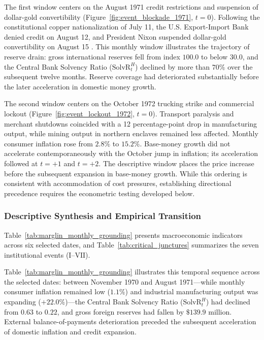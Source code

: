 The first window centers on the August 1971 credit restrictions and suspension of dollar-gold convertibility (Figure~\ref{fig:event_blockade_1971}, $t=0$). Following the constitutional copper nationalization of July 11, the U.S. Export-Import Bank denied credit on August 12, and President Nixon suspended dollar-gold convertibility on August 15 \citep{Zoeller2019}. This monthly window illustrates the trajectory of reserve drain: gross international reserves fell from index $100.0$ to below $30.0$, and the Central Bank Solvency Ratio ($\text{SolvR}^{H}_t$) declined by more than $70\%$ over the subsequent twelve months. Reserve coverage had deteriorated substantially before the later acceleration in domestic money growth.

The second window centers on the October 1972 trucking strike and commercial lockout (Figure~\ref{fig:event_lockout_1972}, $t=0$). Transport paralysis and merchant shutdowns coincided with a 12 percentage-point drop in manufacturing output, while mining output in northern enclaves remained less affected. Monthly consumer inflation rose from $2.8\%$ to $15.2\%$. Base-money growth did not accelerate contemporaneously with the October jump in inflation; its acceleration followed at $t = +1$ and $t = +2$. The descriptive window places the price increase before the subsequent expansion in base-money growth. While this ordering is consistent with accommodation of cost pressures, establishing directional precedence requires the econometric testing developed below.

\subsubsection{Descriptive Synthesis and Empirical Transition}
\label{sec:stylized_synthesis}

Table~\ref{tab:marglin_monthly_grounding} presents macroeconomic indicators across six selected dates, and Table~\ref{tab:critical_junctures} summarizes the seven institutional events ($\mathrm{I}$--$\mathrm{VII}$).





Table~\ref{tab:marglin_monthly_grounding} illustrates this temporal sequence across the selected dates: between November 1970 and August 1971---while monthly consumer inflation remained low ($1.1\%$) and industrial manufacturing output was expanding ($+22.0\%$)---the Central Bank Solvency Ratio ($\text{SolvR}^{H}_t$) had declined from $0.63$ to $0.22$, and gross foreign reserves had fallen by $\$139.9$ million. External balance-of-payments deterioration preceded the subsequent acceleration of domestic inflation and credit expansion.

